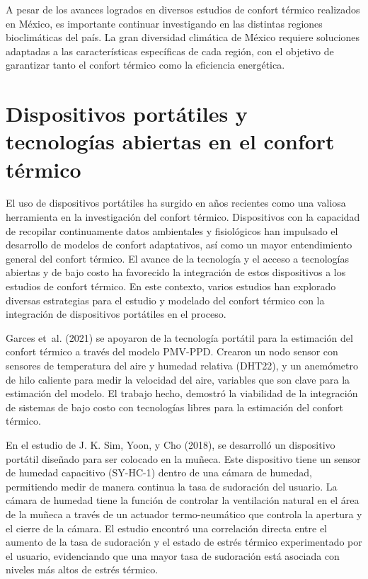 \documentclass[
  12pt,
  letterpaper,
  DIV=11,
  numbers=noendperiod]{scrreport}
\begin{document}
A pesar de los avances logrados en diversos estudios de confort térmico
realizados en México, es importante continuar investigando en las
distintas regiones bioclimáticas del país. La gran diversidad climática
de México requiere soluciones adaptadas a las características
específicas de cada región, con el objetivo de garantizar tanto el
confort térmico como la eficiencia energética.

\hypertarget{dispositivos-portuxe1tiles-y-tecnologuxedas-abiertas-en-el-confort-tuxe9rmico}{%
\section{Dispositivos portátiles y tecnologías abiertas en el confort
térmico}\label{dispositivos-portuxe1tiles-y-tecnologuxedas-abiertas-en-el-confort-tuxe9rmico}}

El uso de dispositivos portátiles ha surgido en años recientes como una
valiosa herramienta en la investigación del confort térmico.
Dispositivos con la capacidad de recopilar continuamente datos
ambientales y fisiológicos han impulsado el desarrollo de modelos de
confort adaptativos, así como un mayor entendimiento general del confort
térmico. El avance de la tecnología y el acceso a tecnologías abiertas y
de bajo costo ha favorecido la integración de estos dispositivos a los
estudios de confort térmico. En este contexto, varios estudios han
explorado diversas estrategias para el estudio y modelado del confort
térmico con la integración de dispositivos portátiles en el proceso.

Garces et~al. (2021) se apoyaron de la tecnología portátil para la
estimación del confort térmico a través del modelo PMV-PPD. Crearon un
nodo sensor con sensores de temperatura del aire y humedad relativa
(DHT22), y un anemómetro de hilo caliente para medir la velocidad del
aire, variables que son clave para la estimación del modelo. El trabajo
hecho, demostró la viabilidad de la integración de sistemas de bajo
costo con tecnologías libres para la estimación del confort térmico.

En el estudio de J. K. Sim, Yoon, y Cho (2018), se desarrolló un
dispositivo portátil diseñado para ser colocado en la muñeca. Este
dispositivo tiene un sensor de humedad capacitivo (SY-HC-1) dentro de
una cámara de humedad, permitiendo medir de manera continua la tasa de
sudoración del usuario. La cámara de humedad tiene la función de
controlar la ventilación natural en el área de la muñeca a través de un
actuador termo-neumático que controla la apertura y el cierre de la
cámara. El estudio encontró una correlación directa entre el aumento de
la tasa de sudoración y el estado de estrés térmico experimentado por el
usuario, evidenciando que una mayor tasa de sudoración está asociada con
niveles más altos de estrés térmico.
\end{document}
